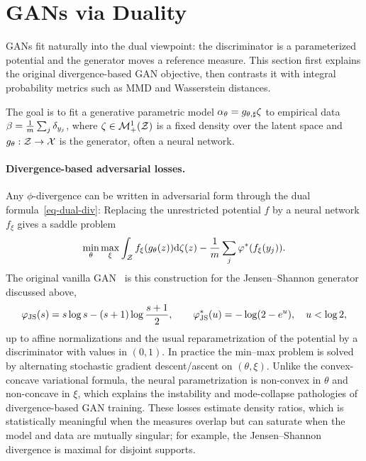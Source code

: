 \section{GANs via Duality}


GANs fit naturally into the dual viewpoint: the discriminator is a parameterized potential and the generator moves a reference measure. This section first explains the original divergence-based GAN objective, then contrasts it with integral probability metrics such as MMD and Wasserstein distances.

The goal is to fit a generative parametric model $\alpha_\theta = g_{\theta,\sharp} \zeta$ to empirical data $\beta = \frac{1}{m}\sum_{j} \delta_{y_j}$, where $\zeta \in \mathcal{M}_+^1(\mathcal{Z})$ is a fixed density over the latent space and $g_\theta : \mathcal{Z} \rightarrow \mathcal{X}$ is the generator, often a neural network.

\paragraph{Divergence-based adversarial losses.}

Any $\phi$-divergence can be written in adversarial form through the dual formula~\eqref{eq-dual-div}:
Replacing the unrestricted potential $f$ by a neural network $f_\xi$ gives a saddle problem
\[
	\min_\theta\max_\xi
	\int_{\mathcal{Z}} f_\xi(g_\theta(z))\mathrm{d}\zeta(z)
	-
	\frac1m\sum_j \varphi^*(f_\xi(y_j)).
\]
The original vanilla GAN~\cite{GAN} is this construction for the Jensen--Shannon generator discussed above,
\[
	\varphi_{\operatorname{JS}}(s)=s\log s-(s+1)\log\frac{s+1}{2},
	\qquad
	\varphi_{\operatorname{JS}}^*(u)=-\log(2-e^u),\quad u<\log2,
\]
up to affine normalizations and the usual reparametrization of the potential by a discriminator with values in $(0,1)$. In practice the min--max problem is solved by alternating stochastic gradient descent/ascent on $(\theta,\xi)$. Unlike the convex-concave variational formula, the neural parametrization is non-convex in $\theta$ and non-concave in $\xi$, which explains the instability and mode-collapse pathologies of divergence-based GAN training. These losses estimate density ratios, which is statistically meaningful when the measures overlap but can saturate when the model and data are mutually singular; for example, the Jensen--Shannon divergence is maximal for disjoint supports.


